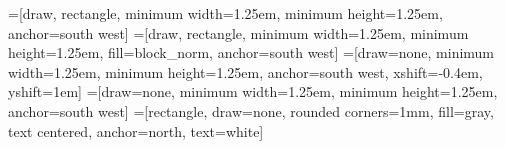 =[draw, rectangle, minimum width=1.25em, minimum height=1.25em, anchor=south west]
=[draw, rectangle, minimum width=1.25em, minimum height=1.25em, fill=block_norm, anchor=south west]
=[draw=none, minimum width=1.25em, minimum height=1.25em, anchor=south west, xshift=-0.4em, yshift=1em]
=[draw=none, minimum width=1.25em, minimum height=1.25em, anchor=south west]
=[rectangle, draw=none, rounded corners=1mm, fill=gray, text centered, anchor=north, text=white]

\newcommand{\segmentationA}[2]{
\node[header] (a0) at (0,0) {#1};
  \xdef\lasti{0}
  \foreach [count=\i, remember=\i as \lasti] \x in {#2} {
    \node[block, minimum width=\x * 1.25 em] (a\i) [right=of a\lasti] {$\x$};
  }
}
\newcommand{\segmentationB}[1]{
\node[header] (b0) [below=of a0] {$s_2$};
  \xdef\lasti{0}
  \foreach [count=\i, remember=\i as \lasti] \x in {#1} {
    \node[block, minimum width=\x * 1.25 em] (b\i) [right=of b\lasti] {$\x$};
  }
}
\newcommand{\segmentationLabels}[1]{
\node[header_bound] (c0) [above=of a0] {};
  \xdef\lasti{0} %
  \foreach \xa/\xb/\xc/\xd/\xe [count=\i, remember=\i as \lasti] in {#1} {
    \node[bound] (c\i) [right=of c\lasti] {
    \begin{minipage}[b][3em]{0.5em}
    \centering
      \ifdefempty{\xe}{}{\xe \\}
      \ifdefempty{\xd}{}{\xd \\}
      \ifdefempty{\xc}{}{\xc \\}
      \ifdefempty{\xb}{}{\xb \\}
      \ifdefempty{\xa}{}{\xa}
    \end{minipage}
    };
  }
}
\newcommand{\segmentationLowerLabels}[1]{
\node[header_bound, yshift=-2em] (c0) [below=of a0] {};
  \xdef\lasti{0} %
  \foreach \xa/\xb/\xc/\xd/\xe [count=\i, remember=\i as \lasti] in {#1} {
    \node[bound] (c\i) [right=of c\lasti] {
    \begin{minipage}[t][3em]{0.5em}
    \centering
      \ifdefempty{\xe}{}{\xe \\}
      \ifdefempty{\xd}{}{\xd \\}
      \ifdefempty{\xc}{}{\xc \\}
      \ifdefempty{\xb}{}{\xb \\}
      \ifdefempty{\xa}{}{\xa}
    \end{minipage}
    };
  }
}
\newcommand{\boundariesOne}[1]{
  $
  \foreach \xa/\xb/\xc/\xd/\xe in {#1} {
    \{
      \ifdefempty{\xa}{{\color{white}0}}{\xa}
      \ifdefempty{\xb}{}{,\xb}
      \ifdefempty{\xc}{}{,\xc}
      \ifdefempty{\xd}{}{,\xd}
      \ifdefempty{\xe}{}{,\xe}
    \}
  }
  $
}

